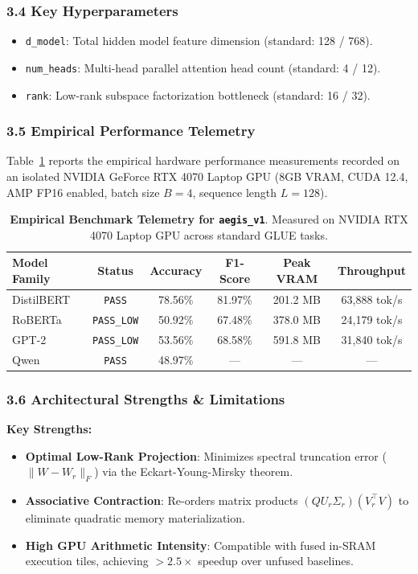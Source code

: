 \subsubsection*{3.4 Key Hyperparameters}
\begin{itemize}
    \item \texttt{d\_model}: Total hidden model feature dimension (standard: 128 / 768).
    \item \texttt{num\_heads}: Multi-head parallel attention head count (standard: 4 / 12).
    \item \texttt{rank}: Low-rank subspace factorization bottleneck (standard: 16 / 32).
\end{itemize}

\subsubsection*{3.5 Empirical Performance Telemetry}
Table~\ref{tab:telemetry_aegis_v1} reports the empirical hardware performance measurements recorded on an isolated NVIDIA GeForce RTX 4070 Laptop GPU (8GB VRAM, CUDA 12.4, AMP FP16 enabled, batch size $B=4$, sequence length $L=128$).

\begin{table}[h]
\centering
\small
\caption{\textbf{Empirical Benchmark Telemetry for \texttt{aegis\_v1}}. Measured on NVIDIA RTX 4070 Laptop GPU across standard GLUE tasks.}
\label{tab:telemetry_aegis_v1}
\begin{tabular*}{\columnwidth}{@{\extracolsep{\fill}}lccccc}
\toprule
\textbf{Model Family} & \textbf{Status} & \textbf{Accuracy} & \textbf{F1-Score} & \textbf{Peak VRAM} & \textbf{Throughput} \\
\midrule
DistilBERT & \texttt{PASS} & 78.56\% & 81.97\% & 201.2 MB & 63,888 tok/s \\
RoBERTa & \texttt{PASS\_LOW} & 50.92\% & 67.48\% & 378.0 MB & 24,179 tok/s \\
GPT-2 & \texttt{PASS\_LOW} & 53.56\% & 68.58\% & 591.8 MB & 31,840 tok/s \\
Qwen & \texttt{PASS} & 48.97\% & --- & --- & --- \\
\bottomrule
\end{tabular*}
\end{table}

\subsubsection*{3.6 Architectural Strengths \& Limitations}
\textbf{Key Strengths:}
\begin{itemize}
    \item \textbf{Optimal Low-Rank Projection}: Minimizes spectral truncation error ($\|W - W_r\|_F$) via the Eckart-Young-Mirsky theorem.
    \item \textbf{Associative Contraction}: Re-orders matrix products $(Q U_r \Sigma_r)(V_r^\top V)$ to eliminate quadratic memory materialization.
    \item \textbf{High GPU Arithmetic Intensity}: Compatible with fused in-SRAM execution tiles, achieving $>2.5\times$ speedup over unfused baselines.
\end{itemize}

